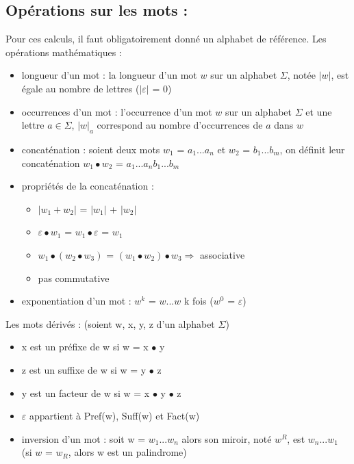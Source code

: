 \documentclass{article}
\begin{document}
\subsection{Opérations sur les mots :}
Pour ces calculs, il faut obligatoirement donné un alphabet de référence. Les opérations \guillemotleft mathématiques \guillemotright :
\begin{itemize}
    \item longueur d'un mot : la longueur d'un mot $w$ sur un alphabet $\Sigma$, notée $|w|$, est égale au nombre de lettres ($|\varepsilon|$ = 0)
    \item occurrences d'un mot : l'occurrence d'un mot $w$ sur un alphabet $\Sigma$ et une lettre $a \in \Sigma$, $|w|_{a}$ correspond au nombre d'occurrences de $a$ dans $w$
    \item concaténation : soient deux mots $w_{1}$ = $a_{1}$...$a_{n}$ et $w_{2}$ = $b_{1}$...$b_{m}$, on définit leur concaténation $w_{1} \bullet w_{2}$ = $a_{1}$...$a_{n}b_{1}$...$b_{m}$
    \item propriétés de la concaténation :
    \begin{itemize}
        \item $|w_{1} + w_{2}|$ = $|w_{1}|$ + $|w_{2}|$
        \item $\varepsilon \bullet w_{1}$ = $w_{1} \bullet \varepsilon$ = $w_{1}$
        \item $w_{1} \bullet (w_{2} \bullet w_{3})$ = $(w_{1} \bullet w_{2}) \bullet w_{3} \Rightarrow$ associative
        \item pas commutative
    \end{itemize}
    \item exponentiation d'un mot : $w^{k}$ = $w$...$w$ k fois ($w^{0}$ = $\varepsilon$)
\end{itemize}
Les mots dérivés : (soient w, x, y, z d'un alphabet $\Sigma$)
\begin{itemize}
    \item x est un préfixe de w si w = x $\bullet$ y
    \item z est un suffixe de w si w = y $\bullet$ z
    \item y est un facteur de w si w = x $\bullet$ y $\bullet$ z
    \item $\varepsilon$ appartient à Pref(w), Suff(w) et Fact(w)
    \item inversion d'un mot : soit w = $w_{1}$...$w_{n}$ alors son miroir, noté $w^{R}$, est $w_{n}$...$w_{1}$ (si $w$ = $w_{R}$, alors w est un palindrome)
\end{itemize}
\end{document}
